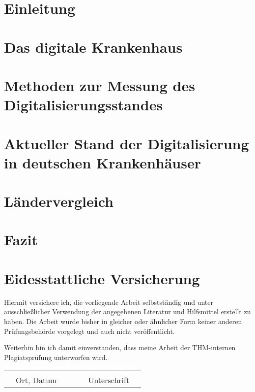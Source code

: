 
% 
{}
\section{Einleitung}

\section{Das digitale Krankenhaus}

\section{Methoden zur Messung des Digitalisierungsstandes}

\section{Aktueller Stand der Digitalisierung in deutschen Krankenhäuser} \label{sec:stand in deutschland}

\section{Ländervergleich} \label{sec:laendervergleich}

\section{Fazit}

\newpage
{}
\setcounter{page}{3}
\listoftables
{}
\newpage
\listoffigures
{}
\newpage
\printbibliography
{}
\newpage
{}
\section*{Eidesstattliche Versicherung}
Hiermit versichere ich, die vorliegende Arbeit selbstständig und unter ausschließlicher Verwendung der angegebenen Literatur und Hilfsmittel erstellt zu haben. Die Arbeit wurde bisher in gleicher oder ähnlicher Form keiner anderen Prüfungsbehörde vorgelegt und auch nicht veröffentlicht.

Weiterhin bin ich damit einverstanden, dass meine Arbeit der THM-internen Plagiatsprüfung unterworfen wird.
\begin{table}[ht]
   \centering 
    \begin{tabular}{cc cp{4cm}c cc}
    &&&&&&\\\cline{1-3}\cline{5-7}
    &Ort, Datum &&&& Unterschrift&\\
    \end{tabular}
\end{table}

